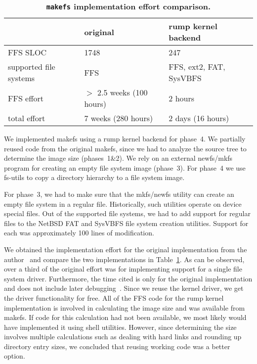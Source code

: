 \begin{table}
\begin{tabular}{|p{2.7cm}|p{4.6cm}|p{4.6cm}|}
\hline
& original & rump kernel backend \\
\hline
\hline
FFS SLOC & 1748 & 247 \\
\hline
supported file systems & FFS &
FFS, ext2, FAT, SysVBFS \\
\hline
FFS effort & $>$ 2.5 weeks (100 hours) & 2 hours \\
\hline
total effort & 7 weeks (280 hours) & 2 days (16 hours) \\
\hline
\end{tabular}
\caption[\texttt{makefs} implementation effort comparison]{
\textbf{\texttt{makefs} implementation effort comparison.}}
\label{tab:makefs}
\end{table}

We implemented makefs using a rump kernel backend for phase~4.  We
partially reused code from the original makefs, since we had to
analyze the source tree to determine the image size (phases~1\&2).
We rely on an external newfs/mkfs program for creating an empty
file system image (phase~3).  For phase~4 we use fs-utils to copy
a directory hierarchy to a file system image.

For phase~3, we had to make sure that the mkfs/newfs utility can
create an empty file system in a regular file.  Historically, such
utilities operate on device special files.  Out of the supported
file systems, we had to add support for regular files to the NetBSD
FAT and SysVBFS file system creation utilities.  Support for each was
approximately 100 lines of modification.

We obtained the implementation effort for the original implementation
from the author~\cite{mewburn:makefsimpl} and compare the
two implementations in Table~\ref{tab:makefs}.  As can be observed,
over a third of the original effort was for implementing support
for a single file system driver.  Furthermore, the time cited is
only for the original implementation and does not include later
debugging~\cite{mewburn:makefsimpl}.  Since we reuse the kernel
driver, we get the driver functionality for free.  All of the FFS
code for the rump kernel implementation is involved in calculating
the image size and was available from makefs.  If code for this calculation
had not been available, we most likely would have implemented it
using shell utilities.  However, since determining the size involves
multiple calculations such as dealing with hard links and rounding
up directory entry sizes, we concluded that reusing working code
was a better option.

